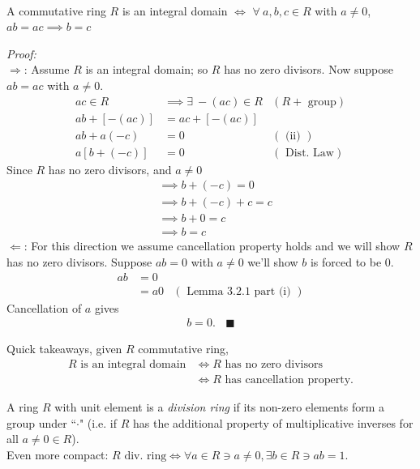 \begin{example} \hspace{0.1in }\\
A commutative ring $R$ is an integral domain $\iff$ $\forall \ a,b,c \in R$ with $a\neq 0$, $ab=ac \implies b=c$

\textit{Proof:} \steezybreak\\
$\Rightarrow$: Assume $R$ is an integral domain; so $R$ has no zero divisors. Now suppose $ab=ac$ with $a\neq 0$.
\begin{align}
    ac\in R &\implies \exists \ -(ac)\in R & (R +\text{ group}) \nonumber \\
    ab+[-(ac)]&= ac + [-(ac)] & \nonumber \\
    ab+a(-c)&=0 & ( \text{ (ii) }) \nonumber \\
    a[b+(-c)]&=0 & (\text{ Dist. Law}) \nonumber
\end{align}
Since $R$ has no zero divisors, and $a\neq 0$ 
\begin{align}
    &\implies b+(-c)=0 \nonumber \\
    &\implies b+(-c)+c= c \nonumber \\
    &\implies b+0= c \nonumber \\
    &\implies b=c \nonumber
\end{align}
$\Leftarrow$: For this direction we assume cancellation property holds and we will show $R$ has no zero divisors. Suppose $ab=0$ with $a\neq 0$ we'll show $b$ is forced to be $0$.
\begin{align}
    ab&=0 & \nonumber \\
    &= a0 &(\text{ Lemma 3.2.1 part (i) }) \nonumber
\end{align}
Cancellation of $a$ gives
\begin{align}
    b=0. \ \ \ \ \blacksquare \nonumber
\end{align}
\end{example}
Quick takeaways, given $R$ commutative ring,
\begin{align}
    R \text{ is an integral domain} &\iff R \text{ has no zero divisors} \nonumber \\
    &\iff R \text{ has cancellation property.} \nonumber
\end{align}

\begin{definition}
    A ring $R$ with unit element is a \textit{division ring} if its non-zero elements form a group under ``$\cdot$" (i.e. if $R$ has the additional property of multiplicative inverses for all $a\neq 0 \in R$). \steezybreak\\
    
    \noindent Even more compact: $R \text{ div. ring} \iff \forall a \in R \ni a\neq 0, \exists b \in R \ni ab=1$.
\end{definition}

